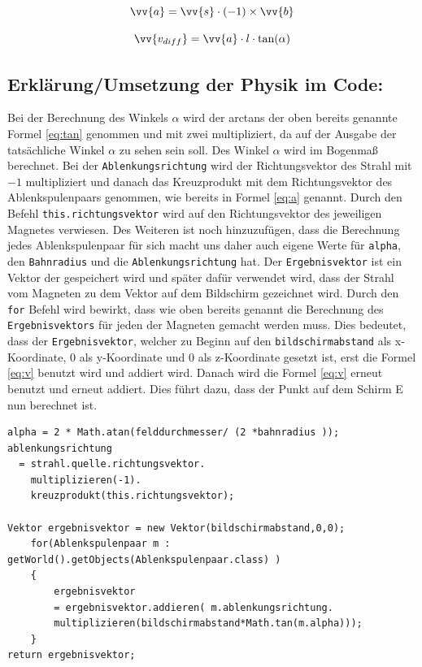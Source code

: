 \begin{equation}
    \label{eq:a}
    \vv{a} = \vv{s} \cdot (-1) \times \vv{b}
\end{equation}

\begin{equation}
    \label{eq:v}
    \vv{v_{diff}} =  \vv{a} \cdot l \cdot \tan(\alpha)
\end{equation}

\subsection{Erklärung/Umsetzung der Physik im Code:}

Bei der Berechnung des Winkels $\alpha$ wird der arctans der oben bereits genannte Formel \ref{eq:tan} genommen und mit zwei multipliziert, da auf der Ausgabe der tatsächliche Winkel $\alpha$ zu sehen sein soll.
Des Winkel $\alpha$ wird im Bogenmaß berechnet.
Bei der \lstinline$Ablenkungsrichtung$ wird der Richtungsvektor des Strahl mit $-1$ multipliziert und danach das Kreuzprodukt mit dem Richtungsvektor des Ablenkspulenpaars genommen, wie bereits in Formel \ref{eq:a} genannt.
Durch den Befehl \lstinline$this.richtungsvektor$ wird auf den Richtungsvektor des jeweiligen Magnetes verwiesen.
Des Weiteren ist noch hinzuzufügen, dass die Berechnung jedes Ablenkspulenpaar für sich macht uns daher auch eigene Werte für \lstinline$alpha$, den \lstinline$Bahnradius$ und die \lstinline$Ablenkungsrichtung$ hat.
Der \lstinline$Ergebnisvektor$ ist ein Vektor der gespeichert wird und später dafür verwendet wird, dass der Strahl vom Magneten zu dem Vektor auf dem Bildschirm gezeichnet wird.
Durch den \lstinline$for$ Befehl wird bewirkt, dass wie oben bereits genannt die Berechnung des \lstinline$Ergebnisvektors$ für jeden der Magneten gemacht werden muss.
Dies bedeutet, dass der \lstinline$Ergebnisvektor$, welcher zu Beginn auf den \lstinline$bildschirmabstand$ als x- Koordinate, $0$ als y-Koordinate und 0 als z-Koordinate gesetzt ist, erst die Formel \ref{eq:v} benutzt wird und addiert wird.
Danach wird die Formel \ref{eq:v} erneut benutzt und erneut addiert. Dies führt dazu, dass der Punkt auf dem Schirm E nun berechnet ist.

\begin{lstlisting}
alpha = 2 * Math.atan(felddurchmesser/ (2 *bahnradius ));
ablenkungsrichtung
  = strahl.quelle.richtungsvektor.
    multiplizieren(-1).
    kreuzprodukt(this.richtungsvektor);

Vektor ergebnisvektor = new Vektor(bildschirmabstand,0,0);
    for(Ablenkspulenpaar m : getWorld().getObjects(Ablenkspulenpaar.class) )
    {
        ergebnisvektor 
        = ergebnisvektor.addieren( m.ablenkungsrichtung.
        multiplizieren(bildschirmabstand*Math.tan(m.alpha)));
    }
return ergebnisvektor;

\end{lstlisting}

